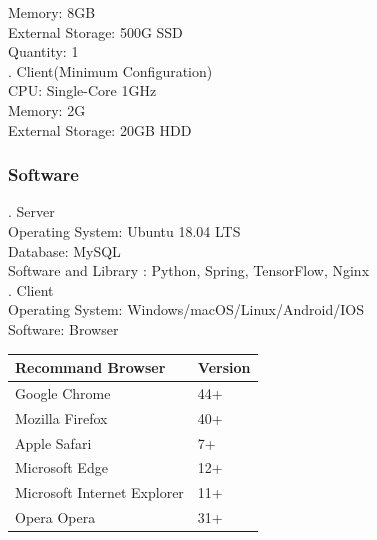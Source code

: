\documentclass[16pt]{scrreprt}
\begin{document}
 
Memory: 8GB\\

 
External Storage: 500G SSD\\

 
Quantity: 1\\

 
. Client(Minimum Configuration)\\

 
CPU: Single-Core 1GHz\\

 
Memory: 2G\\

 
External Storage: 20GB HDD\\

 
\subsubsection{Software}

 
. Server\\

 
Operating System: Ubuntu 18.04 LTS\\

 
Database: MySQL\\

 
Software and Library : Python, Spring, TensorFlow, Nginx\\

 
. Client\\

 
Operating System: Windows/macOS/Linux/Android/IOS\\

 
Software: Browser\\

 
\begin{center}
    \begin{tabular}{p{7cm}p{7cm}}
        \hline
	    Recommand Browser & Version\\
        \hline
	    Google Chrome &  44+\\
        \hline
	    Mozilla Firefox & 40+\\
        \hline
        Apple Safari & 7+\\
        \hline
        Microsoft Edge & 12+\\
        \hline
        Microsoft Internet Explorer & 11+\\
        \hline
        Opera Opera & 31+\\
        \hline

 
    \end{tabular}
\end{center}
\end{document}
